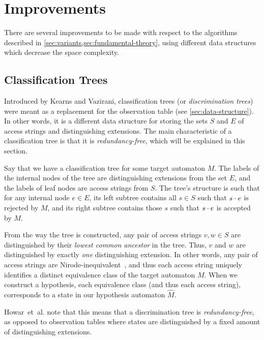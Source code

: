 \documentclass[multi,crop=false,class=article]{standalone}
\begin{document}
\section{Improvements}
\label{sec:improvements}
There are several improvements to be made with respect to the algorithms
described in \cref{sec:variants,sec:fundamental-theory}, using different data
structures which decrease the space complexity.

\subsection{Classification Trees}
\label{sec:classification-trees}
Introduced by Kearns and Vazirani\cite{Kearns94}, classification trees (or
\textit{discrimination trees}) were meant as a replacement for the observation
table (see \cref{sec:data-structure}). In other words, it is a different data
structure for storing the sets $S$ and $E$ of access strings and distinguishing
extensions. The main characteristic of a classification tree is that it is
\textit{redundancy-free}, which will be explained in this section.

Say that we have a classification tree for some target automaton $M$. The labels
of the internal nodes of the tree are distinguishing extensions from the set
$E$, and the labels of leaf nodes are access strings from $S$. The tree's
structure is such that for any internal node $e \in E$, its left subtree
contains all $s \in S$ such that $s \cdot e$ is rejected by $M$, and its right
subtree contains those $s$ such that $s \cdot e$ is accepted by $M$.

From the way the tree is constructed, any pair of access strings $v,w \in S$ are
distinguished by their \textit{lowest common ancestor} in the tree. Thus, $v$
and $w$ are distinguished by exactly \textit{one} distinguishing extension. In
other words, any pair of access strings are Nirode-inequivalent~, and thus each access string uniquely identifies a distinct
equivalence class of the target automaton $M$. When we construct a hypothesis,
each equivalence class (and thus each access string), corresponds to a state in
our hypothesis automaton $\hat M$.

Howar~et~al. note that this means that a discrimination tree is
\textit{redundancy-free}, as opposed to observation tables where states are
distinguished by a fixed amount of distinguishing extensions\cite{Howar14}.
\end{document}
